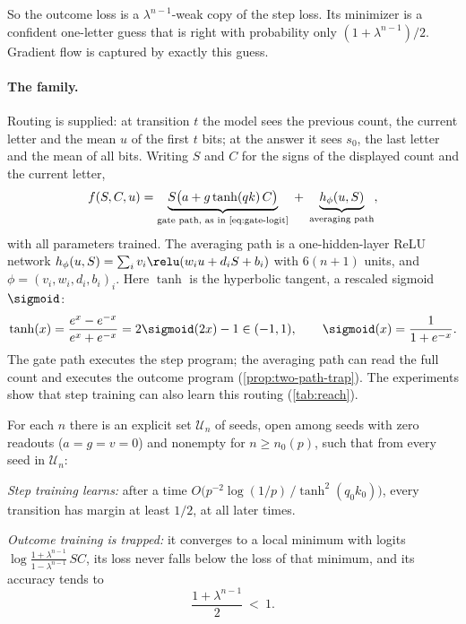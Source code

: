 So the outcome loss is a $\lambda^{n-1}$-weak copy of the step loss. Its minimizer is a confident one-letter guess that is
right with probability only $(1+\lambda^{n-1})/2$. Gradient flow is captured by exactly this guess.

\paragraph{The family.} Routing is supplied: at transition $t$ the model sees the previous count, the current letter
and the mean $u$ of the first $t$ bits; at the answer it sees $s_0$, the last letter and the mean of all bits. Writing $S$
and $C$ for the signs of the displayed count and the current letter,
\begin{equation}
 f(S,C,u)=\underbrace{S\bigl(a+g\tanh(qk)\,C\bigr)}_{\text{gate path, as in \cref{eq:gate-logit}}}
 \;+\;\underbrace{h_\phi(u,S)}_{\text{averaging path}},
 \label{eq:two-path-model}
\end{equation}
with all parameters trained. The averaging path is a one-hidden-layer ReLU network $h_\phi(u,S)=\sum_iv_i\relu(w_iu+d_iS+b_i)$
with $6(n+1)$ units, and $\phi=(v_i,w_i,d_i,b_i)_i$. Here $\tanh$ is the hyperbolic tangent, a rescaled sigmoid $\sigmoid$:
\[
 \tanh(x)=\frac{e^{x}-e^{-x}}{e^{x}+e^{-x}}=2\sigmoid(2x)-1\in(-1,1),\qquad \sigmoid(x)=\frac1{1+e^{-x}} .
\]
The gate path executes the step program; the averaging path can read the full count and executes the outcome program
(\cref{prop:two-path-trap}). The experiments show that step training can also learn this routing (\cref{tab:reach}).

\begin{theorem}
\label{thm:matched}
For each $n$ there is an explicit set $\mathcal U_n$ of seeds, open among seeds with zero readouts ($a=g=v=0$) and
nonempty for $n\ge n_0(p)$, such that from every seed in $\mathcal U_n$:
\begin{thmparts}
\item \emph{Step training learns:} after a time $O\bigl(p^{-2}\log(1/p)\,/\tanh^2(q_0k_0)\bigr)$, every transition has margin
at least $1/2$, at all later times.
\item \emph{Outcome training is trapped:} it converges to a local minimum with logits $\log\frac{1+\lambda^{n-1}}{1-\lambda^{n-1}}\,SC$, its loss
never falls below the loss of that minimum, and its accuracy tends to
\[
 \frac{1+\lambda^{n-1}}2\ <\ 1 .
\]
\end{thmparts}
\end{theorem}

